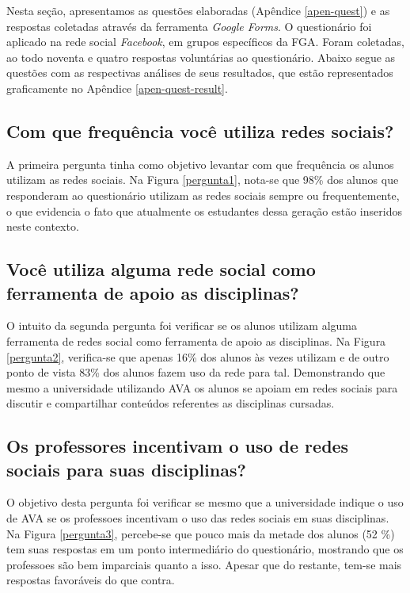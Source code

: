 Nesta seção, apresentamos as questões elaboradas (Apêndice \ref{apen-quest}) e as respostas coletadas através da ferramenta \textit{Google Forms}. O questionário foi aplicado na rede social \textit{Facebook}, em grupos específicos da FGA. Foram coletadas, ao todo noventa e quatro respostas voluntárias ao questionário. Abaixo segue as questões com as respectivas análises de seus resultados, que estão representados graficamente no Apêndice \ref{apen-quest-result}.

\subsection*{Com que frequência você utiliza redes sociais?}

A primeira pergunta tinha como objetivo levantar com que frequência os alunos utilizam as redes sociais. Na Figura \ref{pergunta1}, nota-se que 98\% dos alunos que responderam ao questionário utilizam as redes sociais sempre ou frequentemente, o que evidencia o fato que atualmente os estudantes dessa geração estão inseridos neste contexto.

\subsection*{Você utiliza alguma rede social como ferramenta de apoio as disciplinas?}

O intuito da segunda pergunta foi verificar se os alunos utilizam alguma ferramenta de redes social como ferramenta de apoio as disciplinas. Na Figura \ref{pergunta2}, verifica-se que apenas 16\% dos alunos às vezes utilizam e de outro ponto de vista 83\% dos alunos fazem uso da rede para tal. Demonstrando que mesmo a universidade utilizando AVA os alunos se apoiam em redes sociais para discutir e compartilhar conteúdos referentes as disciplinas cursadas.

\subsection*{Os professores incentivam o uso de redes sociais para suas disciplinas?}

O objetivo desta pergunta foi verificar se mesmo que a universidade indique o uso de AVA se os professoes incentivam o uso das redes sociais em suas disciplinas. Na Figura \ref{pergunta3}, percebe-se que pouco mais da metade dos alunos (52 \%) tem suas respostas em um ponto intermediário do questionário, mostrando que os professoes são bem imparciais quanto a isso. Apesar que do restante, tem-se mais respostas favoráveis do que contra.


